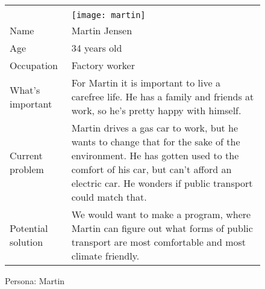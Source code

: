 \noindent
\begin{figure}[H]
    \centering
    \begin{tabularx}{\textwidth}{ | l X | }
        \hline
        &                                                \\
        & \texttt{[image: martin]} \\
        Name       & Martin Jensen                                  \\
        Age        & 34 years old                                   \\
        Occupation & Factory worker                                 \\
        What's important & For Martin it is important to live a carefree life.
        He has a family and friends at work, so he's pretty happy with himself. \\
        Current problem & Martin drives a gas car to work, but he wants to change that for the sake of the environment.
        He has gotten used to the comfort of his car, but can't afford an electric car.
        He wonders if public transport could match that. \\
        Potential solution & We would want to make a program, where Martin can figure out what forms of public transport are
        most comfortable and most climate friendly. \\
        \hline
    \end{tabularx}
    \caption{Persona: Martin}
    \label{fig:persona_martin}
\end{figure}
